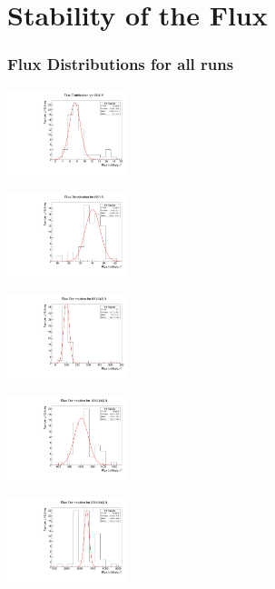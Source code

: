 \documentclass[9pt]{beamer}
\begin{document}
\section{Stability of the Flux}
\begin{frame}
	\frametitle{Flux Distributions for all runs}
	\begin{minipage}{3.5cm}
		\centering
		\includegraphics[angle=270, width=3.5cm]{FluxDistribution65_0}
	\end{minipage}
	\hspace*{2pt}
	\begin{minipage}{3.5cm}
		\centering
		\includegraphics[angle=270, width=3.5cm]{FluxDistribution65_15}
	\end{minipage}
	\hspace*{2pt}
	\begin{minipage}{3.5cm}
		\centering
		\includegraphics[angle=270, width=3.5cm]{FluxDistribution65_45}
	\end{minipage}\s
	\begin{minipage}{3.5cm}
		\centering
		\includegraphics[angle=270, width=3.5cm]{FluxDistribution105_45}
	\end{minipage}
	\hspace*{2pt}
	\begin{minipage}{3.5cm}
		\centering
		\includegraphics[angle=270, width=3.5cm]{FluxDistribution220_45}

\end{minipage}
\end{frame}
\end{document}
